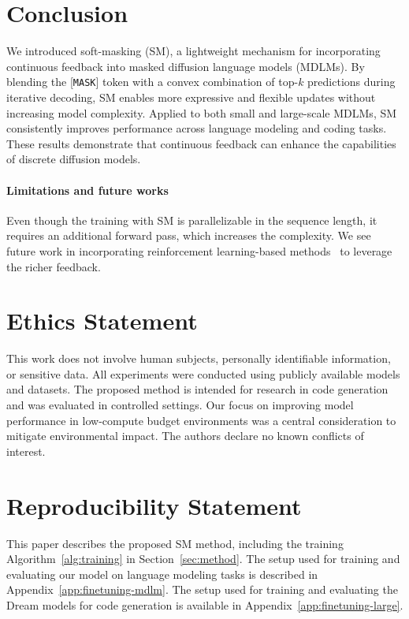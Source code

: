 \documentclass{article}
\newcommand{\mask}{[\texttt{MASK}]\xspace}
\begin{document}
\section{Conclusion}
We introduced soft-masking (SM), a lightweight mechanism for incorporating continuous feedback into masked diffusion language models (MDLMs).
%
By blending the \mask token with a convex combination of top-$k$ predictions during iterative decoding, SM enables more expressive and flexible updates without increasing model complexity.
%
Applied to both small and large-scale MDLMs, SM consistently improves performance across language modeling and coding tasks. 
%
These results demonstrate that continuous feedback can enhance the capabilities of discrete diffusion models. 


\paragraph{Limitations and future works}

Even though the training with SM is parallelizable in the sequence length, it requires an additional forward pass, which increases the complexity. 
% 
We see future work in incorporating reinforcement learning-based methods~\citep{black_training_2023, zhao_d1_2025, zhu_llada_2025} to leverage the richer feedback. 
\section*{Ethics Statement}
This work does not involve human subjects, personally identifiable information, or sensitive data. All experiments were conducted using publicly available models and datasets. The proposed method is intended for research in code generation and was evaluated in controlled settings. Our focus on improving model performance in low-compute budget environments was a central consideration to mitigate environmental impact. The authors declare no known conflicts of interest.

\section*{Reproducibility Statement}
This paper describes the proposed SM method, including the training Algorithm~\ref{alg:training} in Section~\ref{sec:method}. 
The setup used for training and evaluating our model on language modeling tasks is described in Appendix~\ref{app:finetuning-mdlm}. 
The setup used for training and evaluating the Dream models for code generation is available in Appendix~\ref{app:finetuning-large}. 
\end{document}
